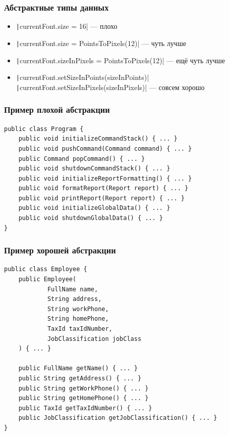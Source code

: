 \documentclass[xetex,mathserif,serif]{beamer}
\begin{document}
	\begin{frame}
		\frametitle{Абстрактные типы данных}
		\begin{itemize}
			\item \texttt|currentFont.size = 16| --- плохо
			\item \texttt|currentFont.size = PointsToPixels(12)| --- чуть лучше
			\item \texttt|currentFont.sizeInPixels = PointsToPixels(12)| --- ещё чуть лучше
			\item \texttt|currentFont.setSizeInPoints(sizeInPoints)| \newline
					\texttt|currentFont.setSizeInPixels(sizeInPixels)| --- совсем хорошо
		\end{itemize}
	\end{frame}

	\begin{frame}[fragile]
		\frametitle{Пример плохой абстракции}
		\begin{verbatim}
public class Program {
    public void initializeCommandStack() { ... }
    public void pushCommand(Command command) { ... }
    public Command popCommand() { ... }
    public void shutdownCommandStack() { ... }
    public void initializeReportFormatting() { ... }
    public void formatReport(Report report) { ... }
    public void printReport(Report report) { ... }
    public void initializeGlobalData() { ... }
    public void shutdownGlobalData() { ... }
}
		\end{verbatim}
\end{frame}

	\begin{frame}[fragile]
		\frametitle{Пример хорошей абстракции}
		\begin{footnotesize}
			\begin{verbatim}
public class Employee {
    public Employee(
            FullName name,
            String address,
            String workPhone,
            String homePhone,
            TaxId taxIdNumber,
            JobClassification jobClass
    ) { ... }

    public FullName getName() { ... }
    public String getAddress() { ... }
    public String getWorkPhone() { ... }
    public String getHomePhone() { ... }
    public TaxId getTaxIdNumber() { ... }
    public JobClassification getJobClassification() { ... }
}
			\end{verbatim}
		\end{footnotesize}
	\end{frame}
\end{document}
